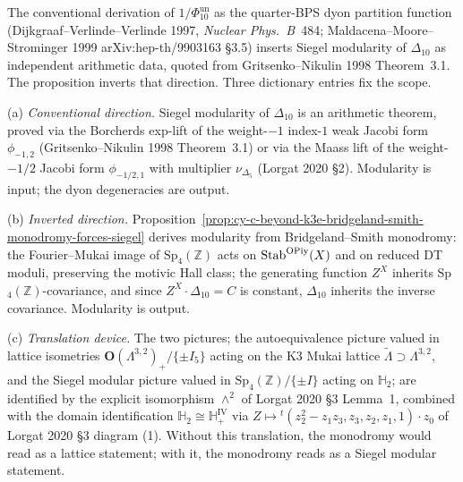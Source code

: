 \begin{remark}
\label{rem:cy-c-beyond-k3e-siegel-as-auteq-shadow}
The conventional derivation of \(1/\Phi_{10}^{\mathrm{un}}\) as the quarter-BPS dyon
partition function (Dijkgraaf--Verlinde--Verlinde 1997,
\emph{Nuclear Phys.\ B}~484; Maldacena--Moore--Strominger 1999
arXiv:hep-th/9903163 \S 3.5) inserts Siegel modularity of $\Delta_{10}$
as independent arithmetic data, quoted from Gritsenko--Nikulin 1998
Theorem~3.1. The proposition inverts that direction. Three dictionary
entries fix the scope.

\textup{(a)} \emph{Conventional direction.} Siegel modularity of
$\Delta_{10}$ is an arithmetic theorem, proved via the Borcherds
exp-lift of the weight-$-1$ index-$1$ weak Jacobi form $\phi_{-1,2}$
(Gritsenko--Nikulin 1998 Theorem~3.1) or via the Maass lift of the
weight-$-1/2$ Jacobi form $\phi_{-1/2,1}$ with multiplier
$\nu_{\Delta_5}$ (Lorgat 2020 \S 2). Modularity is input; the dyon
degeneracies are output.

\textup{(b)} \emph{Inverted direction.} Proposition~\ref{prop:cy-c-beyond-k3e-bridgeland-smith-monodromy-forces-siegel}
derives modularity from Bridgeland--Smith monodromy: the
Fourier--Mukai image of $\mathrm{Sp}_4(\mathbb Z)$ acts on
$\mathrm{Stab}^{\mathrm{OPiy}}(X)$ and on reduced DT moduli, preserving the
motivic Hall class; the generating function $Z^X$ inherits
Sp$_4(\mathbb Z)$-covariance, and since $Z^X\cdot\Delta_{10}=C$ is
constant, $\Delta_{10}$ inherits the inverse covariance. Modularity
is output.

\textup{(c)} \emph{Translation device.} The two pictures; the
autoequivalence picture valued in lattice isometries
$\mathbf O(\Lambda^{3,2})_+/\{\pm I_5\}$ acting on the K3 Mukai
lattice $\widetilde\Lambda\supset\Lambda^{3,2}$, and the Siegel modular
picture valued in $\mathrm{Sp}_4(\mathbb Z)/\{\pm I\}$ acting on
$\mathbb H_2$; are identified by the explicit isomorphism
$\wedge^2$ of Lorgat 2020 \S 3 Lemma~1, combined with the domain
identification $\mathbb H_2\cong\mathbb H_+^{\mathrm{IV}}$ via
$Z\mapsto{}^t(z_2^2-z_1z_3,z_3,z_2,z_1,1)\cdot z_0$ of Lorgat 2020
\S 3 diagram (1). Without this translation, the monodromy would read
as a lattice statement; with it, the monodromy reads as a Siegel
modular statement.


\end{remark}
